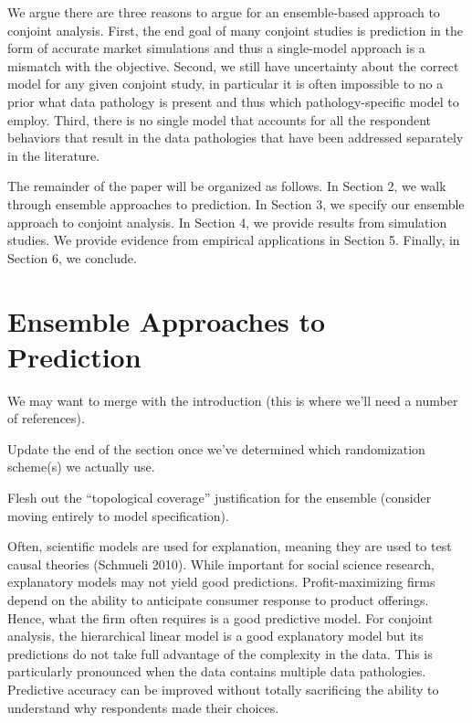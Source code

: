 \documentclass[12pt,titlepage]{mktg-article}
\begin{document}
We argue there are three reasons to argue for an ensemble-based approach to conjoint analysis. First, the end goal of many conjoint studies is prediction in the form of accurate market simulations and thus a single-model approach is a mismatch with the objective. Second, we still have uncertainty about the correct model for any given conjoint study, in particular it is often impossible to no a prior what data pathology is present and thus which pathology-specific model to employ. Third, there is no single model that accounts for all the respondent behaviors that result in the data pathologies that have been addressed separately in the literature.

The remainder of the paper will be organized as follows. In Section 2, we walk through ensemble approaches to prediction. In Section 3, we specify our ensemble approach to conjoint analysis. In Section 4, we provide results from simulation studies. We provide evidence from empirical applications in Section 5. Finally, in Section 6, we conclude.

\hypertarget{ensemble-approaches-to-prediction}{%
\section{Ensemble Approaches to Prediction}\label{ensemble-approaches-to-prediction}}

We may want to merge with the introduction (this is where we'll need a number of references).

Update the end of the section once we've determined which randomization scheme(s) we actually use.

Flesh out the ``topological coverage'' justification for the ensemble (consider moving entirely to model specification).

Often, scientific models are used for explanation, meaning they are used to test causal theories (Schmueli 2010). While important for social science research, explanatory models may not yield good predictions. Profit-maximizing firms depend on the ability to anticipate consumer response to product offerings. Hence, what the firm often requires is a good predictive model. For conjoint analysis, the hierarchical linear model is a good explanatory model but its predictions do not take full advantage of the complexity in the data. This is particularly pronounced when the data contains multiple data pathologies. Predictive accuracy can be improved without totally sacrificing the ability to understand why respondents made their choices.
\end{document}
